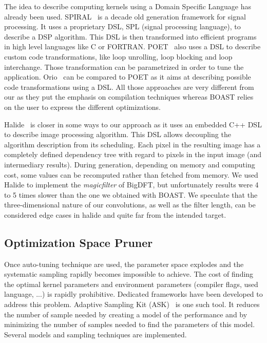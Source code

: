 \documentclass[11pt, a4paper, twoside]{montblanc}
\begin{document}
  The idea to describe computing kernels using a Domain Specific Language has
already been used. SPIRAL~\cite{puschel2004spiral} is a decade old generation
framework for signal processing. It uses a proprietary DSL, SPL (signal
processing language), to describe a DSP algorithm. This DSL is then transformed
into efficient programs in high level languages like C or FORTRAN.
POET~\cite{yi2007poet} also uses a DSL to describe custom code transformations,
like loop unrolling, loop blocking and loop interchange. Those transformation
can be parametrized in order to tune the application. Orio~\cite{Hart2009:Orio}
can be compared to POET as it aims at describing possible code transformations
using a DSL. All those approaches are very different from our as they put the
emphasis on compilation techniques whereas BOAST relies on the user to express
the different optimizations.

  Halide~\cite{ragan2013halide} is closer in some ways to our approach as it
uses an embedded C++ DSL to describe image processing algorithm. This DSL allows
decoupling the algorithm description from its scheduling. Each pixel in the
resulting image has a completely defined dependency tree with regard to pixels
in the input image (and intermediary results). During generation, depending on
memory and computing cost, some values can be recomputed rather than fetched from
memory. We used Halide to implement the \emph{magicfilter} of BigDFT, but
unfortunately results were 4 to 5 times slower than the one we obtained with
BOAST. We speculate that the three-dimensional nature of our convolutions, as
well as the filter length, can be considered edge cases in halide and quite far
from the intended target.

  \subsection{Optimization Space Pruner}

  Once auto-tuning technique are used, the parameter space explodes and the
systematic sampling rapidly becomes impossible to achieve. The cost of finding
the optimal kernel parameters and environment parameters (compiler flags, used
language, ...) is rapidly prohibitive. Dedicated frameworks have been developed
to address this problem. Adaptive Sampling Kit (ASK)~\cite{castro2013adaptive}
is one such tool. It reduces the number of sample needed by creating a model of
the performance and by minimizing the number of samples needed to find the
parameters of this model. Several models and sampling techniques are
implemented.
\end{document}
